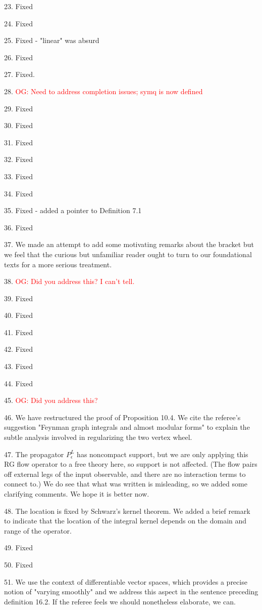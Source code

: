 \documentclass[10pt]{amsart}
\def\owen{\textcolor{red}{OG: }\textcolor{red}}
\begin{document}
23. Fixed

24. Fixed

25. Fixed - "linear" was absurd

26. Fixed

27. Fixed.

28. \owen{Need to address completion issues; symq is now defined}

29. Fixed

30. Fixed

31. Fixed

32. Fixed

33. Fixed

34. Fixed

35. Fixed - added a pointer to Definition 7.1

36. Fixed

37. We made an attempt to add some motivating remarks about the bracket but we feel that the curious but unfamiliar reader ought to turn to our foundational texts for a more serious treatment.

38. \owen{Did you address this? I can't tell.}

39. Fixed

40. Fixed

41. Fixed

42. Fixed

43. Fixed

44. Fixed

45.  \owen{Did you address this?}

46. We have restructured the proof of Proposition 10.4.
We cite the referee's suggestion "Feynman graph integrals and almost modular forms" to explain the subtle analysis involved in regularizing the two vertex wheel.

47. The propagator $P^L_\epsilon$ has noncompact support, but we are only applying this RG flow operator to a free theory here, so support is not affected. (The flow pairs off external legs of the input observable, and there are no interaction terms to connect to.) We do see that what was written is misleading, so we added some clarifying comments. We hope it is better now.

48. The location is fixed by Schwarz's kernel theorem. We added a brief remark to indicate that the location of the integral kernel depends on the domain and range of the operator.

49. Fixed

50. Fixed

51. We use the context of differentiable vector spaces, which provides a precise notion of "varying smoothly" and we address this aspect in the sentence preceding definition 16.2. If the referee feels we should nonetheless elaborate, we can.
\end{document}
